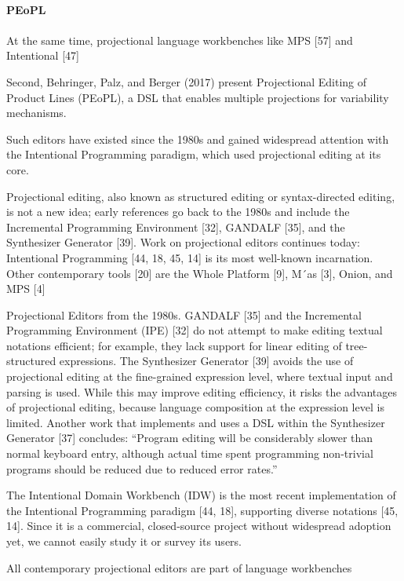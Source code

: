 \paragraph{PEoPL}
\paragraph{}
At the same time, projectional language workbenches like MPS [57] and Intentional [47]

Second, Behringer, Palz, and Berger (2017) present Projectional Editing of Product Lines (PEoPL), a DSL that enables multiple projections for variability mechanisms.

Such editors have existed since the 1980s and gained widespread attention with the Intentional Programming paradigm, which used projectional editing at its core.

Projectional editing, also known as structured editing or syntax-directed editing, is not a new idea; early references go back to the 1980s and include the Incremental Programming Environment [32], GANDALF [35], and the Synthesizer Generator [39].
Work on projectional editors continues today: Intentional Programming [44, 18, 45, 14] is its most well-known incarnation.
Other contemporary tools [20] are the Whole Platform [9], M´as [3], Onion, and MPS [4]

Projectional Editors from the 1980s.
GANDALF [35] and the Incremental Programming Environment (IPE) [32] do not attempt to make editing textual notations efficient; for example, they lack support for linear editing of tree-structured expressions.
The Synthesizer Generator [39] avoids the use of projectional editing at the fine-grained expression level, where textual input and parsing is used.
While this may improve editing efficiency, it risks the advantages of projectional editing, because language composition at the expression level is limited.
Another work that implements and uses a DSL within the Synthesizer Generator [37] concludes: “Program editing will be considerably slower than normal keyboard entry, although actual time spent programming non-trivial programs should be reduced due to reduced error rates.”

The Intentional Domain Workbench (IDW) is the most recent implementation of the Intentional Programming paradigm [44, 18], supporting diverse notations [45, 14].
Since it is a commercial, closed-source project without widespread adoption yet, we cannot easily study it or survey its users.


All contemporary projectional editors are part of language workbenches

